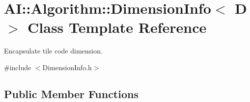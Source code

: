 \hypertarget{classAI_1_1Algorithm_1_1DimensionInfo}{\section{A\-I\-:\-:Algorithm\-:\-:Dimension\-Info$<$ D $>$ Class Template Reference}
\label{classAI_1_1Algorithm_1_1DimensionInfo}
}


Encapsulate tile code dimension.  




{\ttfamily \#include $<$Dimension\-Info.\-h$>$}

\subsection*{Public Member Functions}
